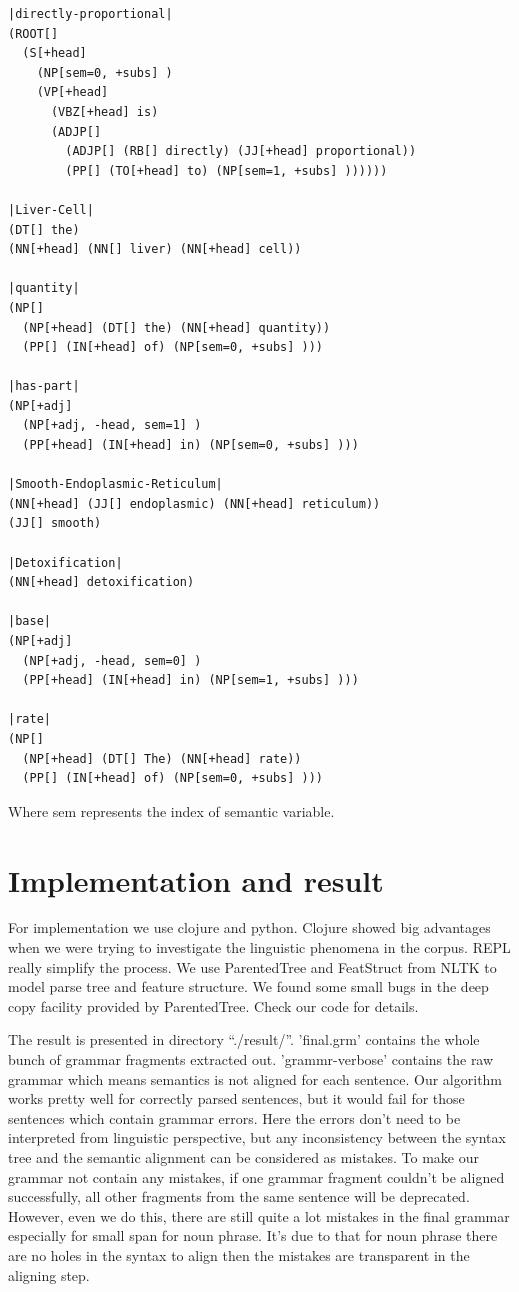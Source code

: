 \documentclass[a4paper]{article}
\begin{document}
\begin{verbatim}
|directly-proportional|
(ROOT[]
  (S[+head]
    (NP[sem=0, +subs] )
    (VP[+head]
      (VBZ[+head] is)
      (ADJP[]
        (ADJP[] (RB[] directly) (JJ[+head] proportional))
        (PP[] (TO[+head] to) (NP[sem=1, +subs] ))))))

|Liver-Cell|
(DT[] the)
(NN[+head] (NN[] liver) (NN[+head] cell))

|quantity|
(NP[]
  (NP[+head] (DT[] the) (NN[+head] quantity))
  (PP[] (IN[+head] of) (NP[sem=0, +subs] )))

|has-part|
(NP[+adj]
  (NP[+adj, -head, sem=1] )
  (PP[+head] (IN[+head] in) (NP[sem=0, +subs] )))

|Smooth-Endoplasmic-Reticulum|
(NN[+head] (JJ[] endoplasmic) (NN[+head] reticulum))
(JJ[] smooth)

|Detoxification|
(NN[+head] detoxification)

|base|
(NP[+adj]
  (NP[+adj, -head, sem=0] )
  (PP[+head] (IN[+head] in) (NP[sem=1, +subs] )))

|rate|
(NP[]
  (NP[+head] (DT[] The) (NN[+head] rate))
  (PP[] (IN[+head] of) (NP[sem=0, +subs] )))
\end{verbatim}
Where sem represents the index of semantic variable.

\section{Implementation and result}
For implementation we use clojure and python. Clojure showed big advantages when we were trying to investigate the linguistic phenomena in the corpus. REPL really simplify the process. 
We use ParentedTree and FeatStruct from NLTK to model parse tree and feature structure. We found some small bugs in the deep copy facility provided by ParentedTree. Check our code for details.

The result is presented in directory ``./result/''. 'final.grm' contains the whole bunch of grammar fragments extracted out. 'grammr-verbose' contains the raw grammar which means semantics is not aligned for each sentence. Our algorithm works pretty well for correctly parsed sentences, but it would fail for those sentences which contain grammar errors. Here the errors don't need to be interpreted from linguistic perspective, but any inconsistency between the syntax tree and the semantic alignment can be considered as mistakes. To make our grammar not contain any mistakes, if one grammar fragment couldn't be aligned successfully, all other fragments from the same sentence will be deprecated.
However, even we do this, there are still quite a lot mistakes in the final grammar especially for small span for noun phrase. It's due to that for noun phrase there are no holes in the syntax to align then the mistakes are transparent in the aligning step.
\end{document}
